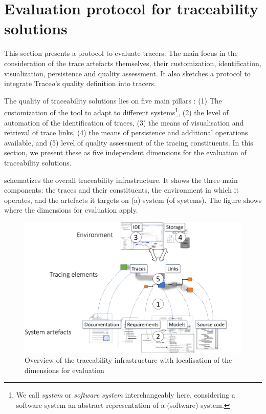 \section{Evaluation protocol for traceability solutions}\label{sec:evaluation}
This section presents {a protocol to evaluate tracers}. The main focus in the consideration of the trace artefacts themselves, their customization, identification, visualization, persistence and quality assessment. It also sketches {a protocol to integrate Trace\textit{a}'s quality definition into tracers}.
\sideboxend

The quality of traceability solutions lies on five main pillars : 
(1) The customization of the tool to adapt to different systems\footnote{We call \textit{system} or \textit{software system} interchangeably here, considering a software system an abstract representation of a (software) system.}, 
(2) the level of automation of the identification of traces, 
(3) the means of visualisation and retrieval of trace links, 
(4) the means of persistence and additional operations available, 
and (5) level of quality assessment of the tracing constituents.
In this section, we present these as five independent dimensions for the evaluation of traceability solutions. 

 schematizes the overall traceability infrastructure. It shows the three main components: the traces and their constituents, the environment in which it operates, and the artefacts it targets on (a) system (of systems). The figure shows where the dimensions for evaluation apply.
 
\begin{figure}[h]  
	\centering
	\includegraphics[width=.85\linewidth]{images/evaluation-points.pdf}
	\caption{Overview of the traceability infrastructure with localisation of the dimensions for evaluation}
	\label{fig:evaluationpoints}
\end{figure}

